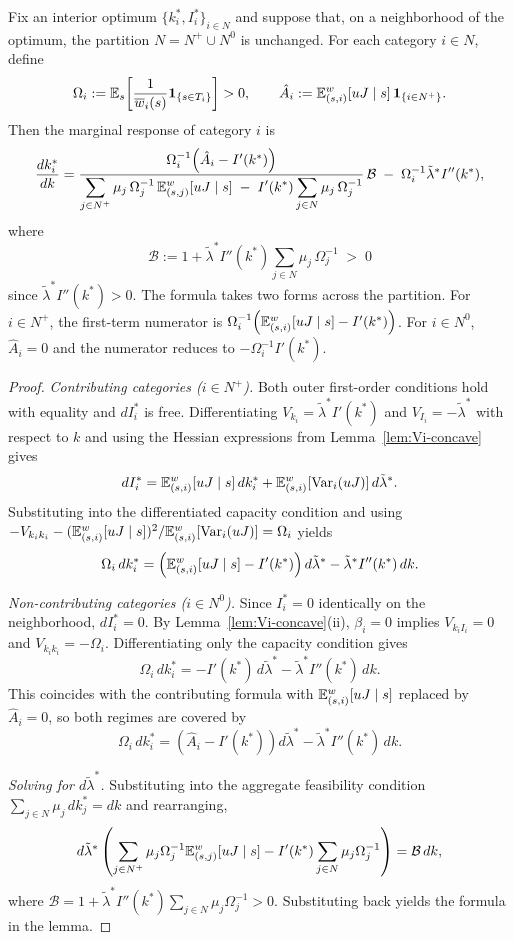 \documentclass[master.tex]{subfiles}
\begin{document}
\begin{lemma}\label{lem:dkidk}
Fix an interior optimum $\{k_i^\ast,I_i^\ast\}_{i\in N}$ and suppose that, on a neighborhood of the optimum, the partition $N=N^+\cup N^0$ is unchanged. For each category $i\in N$, define \[ \Omega_i := \mathbb{E}_s\!\left[\frac{1}{\overline w_i(s)}\mathbf 1_{\{s\in T_i\}}\right]>0, \qquad \hat A_i := \mathbb{E}_{(s,i)}^w[uJ\mid s]\,\mathbf 1_{\{i\in N^+\}}. \] Then the marginal response of category $i$ is \[ \frac{dk_i^\ast}{dk} = \frac{\Omega_i^{-1}\!\left(\hat A_i-I'(k^\ast)\right)}{\displaystyle\sum_{j\in N^+}\mu_j\,\Omega_j^{-1}\,\mathbb{E}_{(s,j)}^w[uJ\mid s] \;-\; I'(k^\ast)\sum_{j\in N}\mu_j\,\Omega_j^{-1}}\,\mathcal B \;-\;\Omega_i^{-1}\tilde\lambda^\ast I''(k^\ast), \] where \[ \mathcal B := 1+\tilde\lambda^\ast I''(k^\ast)\sum_{j\in N}\mu_j\,\Omega_j^{-1}\;>\;0 \] since $\tilde\lambda^\ast I''(k^\ast)>0$. The formula takes two forms across the partition. For $i\in N^+$, the first-term numerator is $\Omega_i^{-1}\!\left(\mathbb{E}_{(s,i)}^w[uJ\mid s]-I'(k^\ast)\right)$. For $i\in N^0$, $\hat A_i=0$ and the numerator reduces to $-\Omega_i^{-1}I'(k^\ast)$.
\end{lemma}
\begin{proof}
\textit{Contributing categories ($i\in N^+$).} Both outer first-order conditions hold with equality and $dI_i^\ast$ is free. Differentiating $V_{k_i}=\tilde\lambda^\ast I'(k^\ast)$ and $V_{I_i}=-\tilde\lambda^\ast$ with respect to $k$ and using the Hessian expressions from Lemma~\ref{lem:Vi-concave} gives
\[
dI_i^\ast = \mathbb{E}_{(s,i)}^w[uJ\mid s]\,dk_i^\ast + \mathbb{E}_{(s,i)}^w[\mathrm{Var}_i(uJ)]\,d\tilde\lambda^\ast.
\]
Substituting into the differentiated capacity condition and using $-V_{k_ik_i}-(\mathbb{E}_{(s,i)}^w[uJ\mid s])^2/\mathbb{E}_{(s,i)}^w[\mathrm{Var}_i(uJ)]=\Omega_i$ yields
\[
\Omega_i\,dk_i^\ast = \left(\mathbb{E}_{(s,i)}^w[uJ\mid s]-I'(k^\ast)\right)d\tilde\lambda^\ast - \tilde\lambda^\ast I''(k^\ast)\,dk.
\]

\textit{Non-contributing categories ($i\in N^0$).} Since $I_i^\ast=0$ identically on the neighborhood, $dI_i^\ast=0$. By Lemma~\ref{lem:Vi-concave}(ii), $\beta_i=0$ implies $V_{k_iI_i}=0$ and $V_{k_ik_i}=-\Omega_i$. Differentiating only the capacity condition gives
\[
\Omega_i\,dk_i^\ast = -I'(k^\ast)\,d\tilde\lambda^\ast - \tilde\lambda^\ast I''(k^\ast)\,dk.
\]
This coincides with the contributing formula with $\mathbb{E}_{(s,i)}^w[uJ\mid s]$ replaced by $\hat A_i=0$, so both regimes are covered by
\[
\Omega_i\,dk_i^\ast = \left(\hat A_i - I'(k^\ast)\right)d\tilde\lambda^\ast - \tilde\lambda^\ast I''(k^\ast)\,dk.
\]

\textit{Solving for $d\tilde\lambda^\ast$.} Substituting into the aggregate feasibility condition $\sum_{j\in N}\mu_j\,dk_j^\ast=dk$ and rearranging,
\[
d\tilde\lambda^\ast\left(\sum_{j\in N^+}\mu_j\Omega_j^{-1}\mathbb{E}_{(s,j)}^w[uJ\mid s] - I'(k^\ast)\sum_{j\in N}\mu_j\Omega_j^{-1}\right) = \mathcal B\,dk,
\]
where $\mathcal B=1+\tilde\lambda^\ast I''(k^\ast)\sum_{j\in N}\mu_j\Omega_j^{-1}>0$. Substituting back yields the formula in the lemma.
\end{proof}
\end{document}
